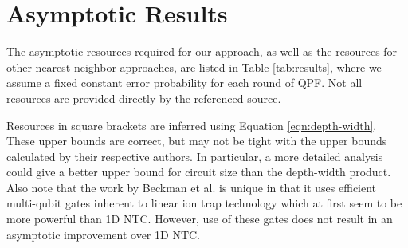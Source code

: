 \section{Asymptotic Results}
\label{sec:fpl-results}

The asymptotic resources required for our approach,
as well as the resources for other nearest-neighbor approaches,
are listed in Table \ref{tab:results},
where we assume a fixed constant error
probability for each round of QPF. Not all resources are
provided directly by the referenced source.

Resources in square brackets
are inferred using Equation \ref{eqn:depth-width}.
These upper bounds are correct,
but may not be tight with the upper bounds
calculated by their respective authors.
In particular, a more detailed analysis
could give a better upper bound for circuit size than the
depth-width product. Also note that the
work by Beckman et al. \cite{Beckman1996} is unique in that it uses
efficient multi-qubit gates inherent to linear ion trap technology which at first
seem to
be more powerful than \textsc{1D NTC}. However, use of these gates does not result in an
asymptotic improvement over \textsc{1D NTC}.

